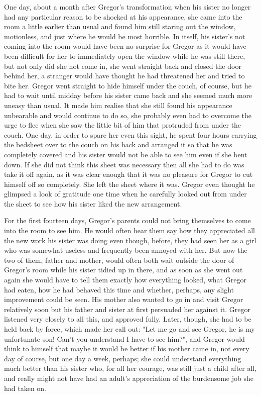One day, about a month after Gregor's transformation when his sister no longer had any particular reason to be shocked at his appearance, she came into the room a little earlier than usual and found him still staring out the window, motionless, and just where he would be most horrible. In itself, his sister's not coming into the room would have been no surprise for Gregor as it would have been difficult for her to immediately open the window while he was still there, but not only did she not come in, she went straight back and closed the door behind her, a stranger would have thought he had threatened her and tried to bite her. Gregor went straight to hide himself under the couch, of course, but he had to wait until midday before his sister came back and she seemed much more uneasy than usual. It made him realise that she still found his appearance unbearable and would continue to do so, she probably even had to overcome the urge to flee when she saw the little bit of him that protruded from under the couch. One day, in order to spare her even this sight, he spent four hours carrying the bedsheet over to the couch on his back and arranged it so that he was completely covered and his sister would not be able to see him even if she bent down. If she did not think this sheet was necessary then all she had to do was take it off again, as it was clear enough that it was no pleasure for Gregor to cut himself off so completely. She left the sheet where it was. Gregor even thought he glimpsed a look of gratitude one time when he carefully looked out from under the sheet to see how his sister liked the new arrangement.

For the first fourteen days, Gregor's parents could not bring themselves to come into the room to see him. He would often hear them say how they appreciated all the new work his sister was doing even though, before, they had seen her as a girl who was somewhat useless and frequently been annoyed with her. But now the two of them, father and mother, would often both wait outside the door of Gregor's room while his sister tidied up in there, and as soon as she went out again she would have to tell them exactly how everything looked, what Gregor had eaten, how he had behaved this time and whether, perhaps, any slight improvement could be seen. His mother also wanted to go in and visit Gregor relatively soon but his father and sister at first persuaded her against it. Gregor listened very closely to all this, and approved fully. Later, though, she had to be held back by force, which made her call out: "Let me go and see Gregor, he is my unfortunate son! Can't you understand I have to see him?", and Gregor would think to himself that maybe it would be better if his mother came in, not every day of course, but one day a week, perhaps; she could understand everything much better than his sister who, for all her courage, was still just a child after all, and really might not have had an adult's appreciation of the burdensome job she had taken on.

